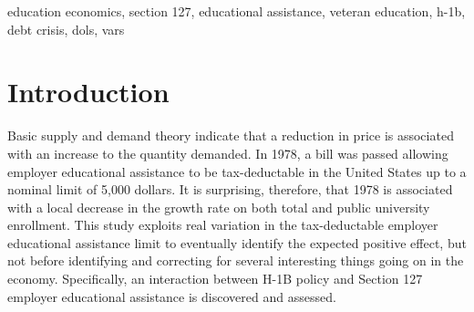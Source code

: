 \documentclass[review]{elsarticle}
\begin{document}
\begin{frontmatter}
\begin{keyword}
education economics, section 127, educational assistance, veteran education, h-1b, debt crisis, dols, vars
\MSC[2010] %
\end{keyword}
\end{frontmatter}

\pagebreak
\linenumbers

    \section{Introduction}



    Basic supply and demand theory indicate that a reduction in price is associated with an increase to the quantity demanded.
    In 1978, a bill was passed allowing employer educational assistance to be tax-deductable in the United States up to a nominal limit of 5,000 dollars.
    It is surprising, therefore, that 1978 is associated with a local decrease in the growth rate on both total and public university enrollment.
    This study exploits real variation in the tax-deductable employer educational assistance limit to eventually identify the expected positive effect,
    but not before identifying and correcting for several interesting things going on in the economy.
    Specifically, an interaction between H-1B policy and Section 127 employer educational assistance is discovered and assessed.
\end{document}
